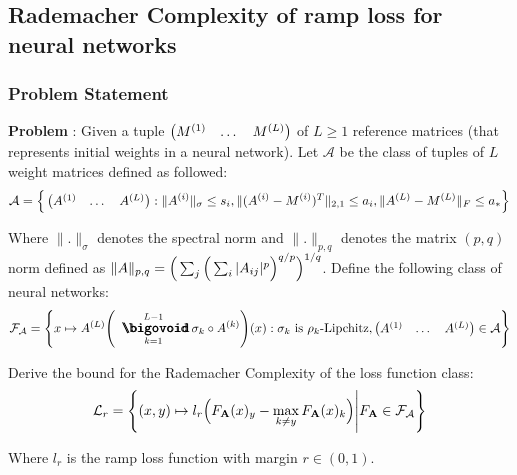 \newpage
\subsection{Rademacher Complexity of ramp loss for neural networks}
\subsubsection{Problem Statement}
\label{sec:rad_complexity_of_ramp_loss_nn}
\textbf{Problem} : Given a tuple $\begin{pmatrix}M^{(1)} & \dots & M^{(L)}\end{pmatrix}$ of $L\ge 1$ reference matrices (that represents initial weights in a neural network). Let $\mathcal{A}$ be the class of tuples of $L$ weight matrices defined as followed:
\begin{align*}
    \mathcal{A} = \Big\{ 
        \begin{pmatrix}
            A^{(1)} & \dots & A^{(L)}
        \end{pmatrix} : \|A^{(i)}\|_\sigma \le s_i, \|(A^{(i)} - M^{(i)})^T\|_{2, 1}\le a_i, \|A^{(L)} - M^{(L)}\|_F \le a_*
     \Big\}
\end{align*}

\noindent Where $\|.\|_\sigma$ denotes the spectral norm and $\|.\|_{p, q}$ denotes the matrix $(p, q)$ norm defined as $\|A\|_{p, q} = \Big( \sum_j\Big( \sum_{i}|A_{ij}|^p \Big)^{q/p} \Big)^{1/q}$. Define the following class of neural networks:
\begin{align*}
    \F_\mathcal{A} = \biggCurl{
        x\mapsto \A{L} \biggRound{
            \bigO_{k=1}^{L-1} \sigma_k \circ \A{k}
        }(x) : \sigma_k \text{ is } \rho_k\text{-Lipchitz}, \begin{pmatrix}
            \A{1} & \dots & \A{L}
        \end{pmatrix} \in \mathcal{A}
    }
\end{align*}

\noindent Derive the bound for the Rademacher Complexity of the loss function class:
\begin{align*}
    \mathcal{L}_r = \Bigg\{ 
        (x, y) \mapsto l_r\Big( 
            F_{\bf A}(x)_y - \max_{k\ne y}F_{\bf A}(x)_k
         \Big) \Bigg| F_{\bf A} \in \mathcal{F}_\mathcal{A}
     \Bigg\}
\end{align*}

\noindent Where $l_r$ is the ramp loss function with margin $r\in(0,1)$.

